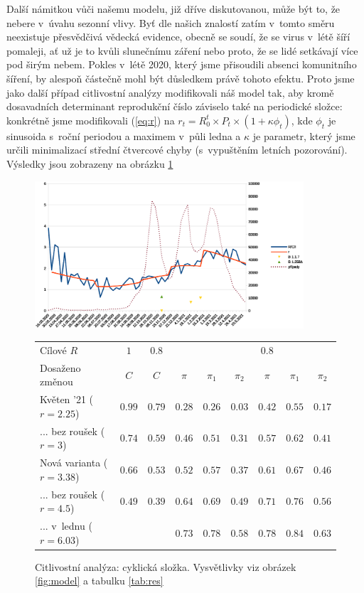 Další námitkou vůči našemu modelu, již dříve diskutovanou, může být to, že nebere v~úvahu sezonní
vlivy. Byť dle našich znalostí zatím v~tomto směru neexistuje přesvědčivá vědecká
evidence, obecně se soudí, že se virus v~létě šíří pomaleji, ať už
je to kvůli slunečnímu záření nebo proto, že se lidé setkávají více
pod širým nebem. Pokles v~létě 2020, který jsme přisoudili absenci
komunitního šíření, by alespoň částečně mohl být důsledkem právě tohoto
efektu. Proto jsme jako další případ citlivostní analýzy modifikovali
náš model tak, aby kromě dosavadních determinant reprodukční číslo záviselo
také na periodické složce: konkrétně jsme modifikovali (\ref{eq:r}) na 
$r_{t}=R_{0}^{t}\times P_{t}\times(1+\kappa\phi_{t})$, kde $\phi_{t}$
je sinusoida s~roční periodou a maximem v~půli ledna a $\kappa$ je
parametr, který jsme určili minimalizací střední čtvercové chyby
(s~vypuštěním letních pozorování). Výsledky jsou zobrazeny na obrázku \ref{fig:cc}

\begin{figure}

\begin{center}

\includegraphics[width=10cm]{pic/wholec} 

\begin{tabular}{l|c|c|ccc|ccc}									
Cílové $R$	& $1$	& $0.8$	&	&	&	& $0.8$	&	&	\\ 
Dosaženo změnou	& $C$	& $C$	& $\pi$	& $\pi_1$	& $\pi_2$	& $\pi$	& $\pi_1$	& $\pi_2$	\\ \hline
Květen '21 ($r=2.25$)	& $0.99$	& $0.79$	& $0.28$	& $0.26$	& $0.03$	& $0.42$	& $0.55$	& $0.17$	\\
... bez roušek ($r=3$)	& $0.74$	& $0.59$	& $0.46$	& $0.51$	& $0.31$	& $0.57$	& $0.62$	& $0.41$	\\
Nová varianta ($r=3.38$)	& $0.66$	& $0.53$	& $0.52$	& $0.57$	& $0.37$	& $0.61$	& $0.67$	& $0.46$	\\
... bez roušek ($r=4.5$)	& $0.49$	& $0.39$	& $0.64$	& $0.69$	& $0.49$	& $0.71$	& $0.76$	& $0.56$	\\
... v~lednu ($r=6.03$)	&	&	& $0.73$	& $0.78$	& $0.58$	& $0.78$	& $0.84$	& $0.63$	\\
\end{tabular}									


\caption{Citlivostní analýza: cyklická složka. Vysvětlivky viz obrázek \ref{fig:model} a tabulku \ref{tab:res}}
\label{fig:cc}
\end{center}

\end{figure}


